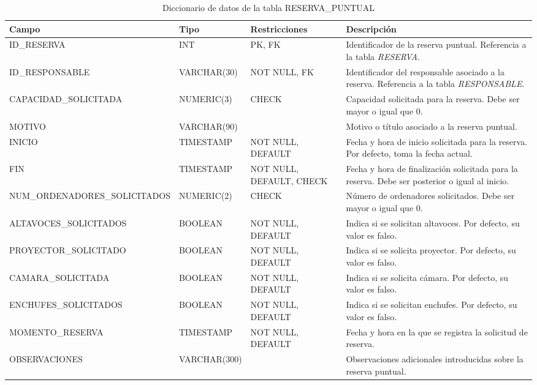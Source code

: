 \begin{table}[H]
	\centering
	\scriptsize
	\setlength{\tabcolsep}{3pt}
	\renewcommand{\arraystretch}{1.15}
	\begin{tabularx}{\textwidth}{@{}
			>{\raggedright\arraybackslash}p{2.6cm}
			>{\raggedright\arraybackslash}p{2.2cm}
			>{\raggedright\arraybackslash}p{2.2cm}
			X@{}}
		\toprule
		\textbf{Campo} & \textbf{Tipo} & \textbf{Restricciones} & \textbf{Descripción} \\
		\midrule
		ID\_\newline RESERVA & INT & PK, FK & Identificador de la reserva puntual. Referencia a la tabla \textit{RESERVA}. \\
		ID\_\newline RESPONSABLE & VARCHAR(30) & NOT NULL, FK & Identificador del responsable asociado a la reserva. Referencia a la tabla \textit{RESPONSABLE}. \\
		CAPACIDAD\_\newline SOLICITADA & NUMERIC(3) & CHECK & Capacidad solicitada para la reserva. Debe ser mayor o igual que 0. \\
		MOTIVO & VARCHAR(90) &  & Motivo o título asociado a la reserva puntual. \\
		INICIO & TIMESTAMP & NOT NULL, DEFAULT & Fecha y hora de inicio solicitada para la reserva. Por defecto, toma la fecha actual. \\
		FIN & TIMESTAMP & NOT NULL, DEFAULT, CHECK & Fecha y hora de finalización solicitada para la reserva. Debe ser posterior o igual al inicio. \\
		NUM\_\newline ORDENADORES\_\newline SOLICITADOS & NUMERIC(2) & CHECK & Número de ordenadores solicitados. Debe ser mayor o igual que 0. \\
		ALTAVOCES\_\newline SOLICITADOS & BOOLEAN & NOT NULL, DEFAULT & Indica si se solicitan altavoces. Por defecto, su valor es falso. \\
		PROYECTOR\_\newline SOLICITADO & BOOLEAN & NOT NULL, DEFAULT & Indica si se solicita proyector. Por defecto, su valor es falso. \\
		CAMARA\_\newline SOLICITADA & BOOLEAN & NOT NULL, DEFAULT & Indica si se solicita cámara. Por defecto, su valor es falso. \\
		ENCHUFES\_\newline SOLICITADOS & BOOLEAN & NOT NULL, DEFAULT & Indica si se solicitan enchufes. Por defecto, su valor es falso. \\
		MOMENTO\_\newline RESERVA & TIMESTAMP & NOT NULL, DEFAULT & Fecha y hora en la que se registra la solicitud de reserva. \\
		OBSERVACIONES & VARCHAR(300) &  & Observaciones adicionales introducidas sobre la reserva puntual. \\
		\bottomrule
	\end{tabularx}
	\caption{Diccionario de datos de la tabla RESERVA\_PUNTUAL}
	\label{tab:diccionario-reserva-puntual}
\end{table}

